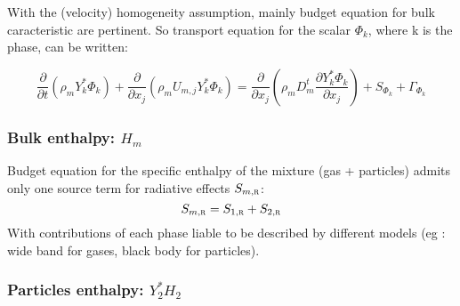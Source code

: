 With the (velocity) homogeneity assumption, mainly budget equation for bulk
caracteristic are pertinent. So transport equation for the scalar $\Phi_{k}$,
where k is the phase, can be written:

\begin{equation}
  \frac{\partial}{\partial t    } (\rho_{m} Y_{k}^{*}\Phi_{k})
 +\frac{\partial}{\partial x_{j}} (\rho_{m} U_{m,j} Y_{k}^{*} \Phi_{k})
              = \frac{\partial}{\partial x_{j}} 
                       (\rho_{m}D_{m}^{t} \frac{\partial Y_{k}^{*} \Phi_{k}}{\partial x_{j}})
               +S_{\Phi_{k}}+\Gamma_{\Phi_{k}}
\end{equation}


\subsubsection{Bulk enthalpy: $H_{m}$ }

Budget equation for the specific enthalpy of the mixture (gas + particles)
admits only one source term for radiative effects
$S_{m,\mbox{\scriptsize\textsc{r}}}$:
\begin{equation}
    S_{m,\mbox{\scriptsize\textsc{r}}}= S_{1,\mbox{\scriptsize\textsc{r}}}+ S_{2,\mbox{\scriptsize\textsc{r}}}
\end{equation}
With contributions of each phase liable to be described by different models (eg
: wide band for gases, black body for particles).

\subsubsection{Particles enthalpy: $Y_{2}^{*}H_{2}$ }

